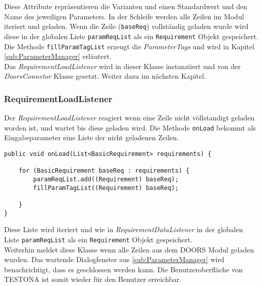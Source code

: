 Diese Attribute repräsentieren die Varianten und einen Standardwert und den Name des jeweiligen Parameters. In der Schleife werden alle Zeilen im Modul iteriert und geladen. Wenn die Zeile (\texttt{baseReq}) vollständig geladen wurde wird diese in der globalen Liste \texttt{paramReqList} als ein \texttt{Requirement} Objekt gespeichert. Die Methode \texttt{fillParamTagList} erzeugt die \textit{ParameterTags} und wird in Kapitel \ref{sub:ParameterManager} erläutert.\\

Das \textit{RequirementLoadListener} wird in dieser Klasse instanziiert und von der \textit{DoorsConnetor} Klasse gesetzt. Weiter dazu im nächsten Kapitel.


\subsubsection{RequirementLoadListener}\label{sub.RequirementLoadListener}
Der \textit{RequirementLoadListener} reagiert wenn eine Zeile nicht völlstandigt geladen worden ist, und wartet bis diese geladen wird. Die Methode \texttt{onLoad} bekommt als Eingabeparameter eine Liste der nicht geladenen Zeilen.

\begin{lstlisting}[caption={Nachladen der Parametertabelle nach Zeilen}, captionpos=b]
public void onLoad(List<BasicRequirement> requirements) {

	for (BasicRequirement baseReq : requirements) {
		paramReqList.add((Requirement) baseReq);
		fillParamTagList((Requirement) baseReq);
		
	}
}
\end{lstlisting}

Diese Liste wird iteriert und wie in \textit{RequirementDataListener} in der globalen Liste \texttt{paramReqList} als ein \texttt{Requirement} Objekt gespeichert.\\

Weiterhin meldet diese Klasse wenn alle Zeilen aus dem DOORS Modul geladen wurden. Das wartende Dialogfenster aus \ref{sub:ParameterManager} wird benachrichtigt, dass es geschlossen werden kann. Die Benutzeroberfläche von TESTONA ist somit wieder für den Benutzer erreichbar.



\newpage
